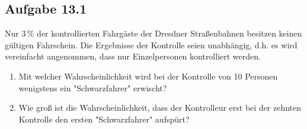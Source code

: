 \documentclass{article}
\begin{document}
	\subsection*{Aufgabe 13.1}
	Nur 3\,\% der kontrollierten Fahrgäste der Dresdner Straßenbahnen besitzen keinen gültigen Fahrschein. Die Ergebnisse der Kontrolle seien unabhängig, d.h. es wird vereinfacht angenommen, dass nur Einzelpersonen kontrolliert werden.
	\begin{enumerate}[label = (\alph*)]
		\item Mit welcher Wahrscheinlichkeit wird bei der Kontrolle von 10 Personen wenigstens ein "Schwarzfahrer" erwischt?
		\item Wie groß ist die Wahrscheinlichkeit, dass der Kontrolleur erst bei der zehnten Kontrolle den ersten "Schwarzfahrer" aufspürt?
	\end{enumerate}
	
\end{document}
